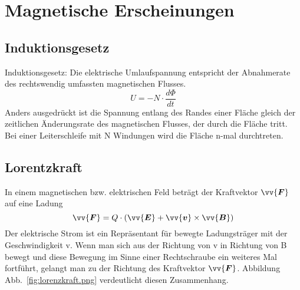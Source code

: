 \documentclass[a4paper,twoside,12pt,DIV=13,BCOR=5mm,numbers=noenddot,cleardoublepage=empty]{scrbook}
\begin{document}
    \section{Magnetische Erscheinungen}
        \subsection{Induktionsgesetz}
        Induktionsgesetz: Die elektrische Umlaufspannung entspricht der 
        Abnahmerate des rechtswendig umfassten magnetischen Flusses.
        \begin{equation}
            U = - N \cdot \frac{d\Phi}{dt} 
        \end{equation}
        Anders ausgedr\"uckt ist die Spannung entlang des Randes einer Fl\"ache 
        gleich der zeitlichen \"Anderungsrate des magnetischen Flusses, der durch 
        die Fl\"ache tritt. Bei einer Leiterschleife mit N Windungen wird die Fl\"ache 
        n-mal durchtreten.
        \subsection{Lorentzkraft}
        In einem magnetischen bzw. elektrischen Feld betr\"agt der Kraftvektor $\vv{\bm{F}}$ auf 
        eine Ladung
        \begin{equation}
            \vv{\bm{F}} = Q \cdot (\vv{\bm{E}} + \vv{\bm{v}} \times \vv{\bm{B}})
        \end{equation}
        Der elektrische Strom ist ein Repr\"asentant f\"ur bewegte Ladungstr\"ager mit 
        der Geschwindigkeit v. Wenn man sich aus der Richtung von v in Richtung 
        von B bewegt und diese Bewegung im Sinne einer Rechtschraube ein weiteres 
        Mal fortf\"uhrt, gelangt man zu der Richtung des Kraftvektor $\vv{\bm{F}}$. Abbildung Abb.~\ref{fig:lorenzkraft.png} 
        verdeutlicht diesen Zusammenhang.
\end{document}

